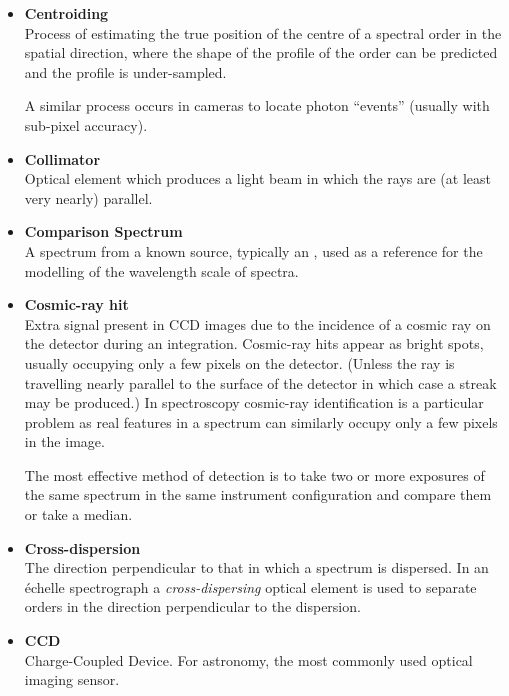 \begin{itemize}
\item {\bf\label{gl_centroiding}Centroiding}\\
      Process of estimating the true position of the centre of a spectral
      order in the spatial direction, where the shape of the profile of
      the order can be predicted and the profile is under-sampled.

      A similar process occurs in  cameras to
      locate photon ``events'' (usually with sub-pixel accuracy).

\item {\bf\label{gl_collimator}Collimator}\\
      Optical element which produces a light beam in which the rays
      are (at least very nearly) parallel.

\item {\bf\label{gl_comparison}Comparison Spectrum}\\
      A spectrum from a known source, typically an
      ,
      used as a reference for the modelling of the wavelength scale of
      spectra.

\item {\bf\label{gl_cosmic_ray}Cosmic-ray hit}\\
      Extra signal present in CCD images due to the incidence of a cosmic
      ray on the detector during an integration.  Cosmic-ray hits appear
      as bright spots, usually occupying only a few pixels on the detector.
      (Unless the ray is travelling nearly parallel to the surface of the
      detector in which case a streak may be produced.)
      In spectroscopy cosmic-ray identification is a particular problem
      as real features in a spectrum can similarly occupy only a few pixels
      in the image.

      The most effective method of detection is to take
      two or more exposures of the same spectrum in the same instrument
      configuration and compare them or take a median.

\item {\bf\label{gl_cross_dispersion}Cross-dispersion}\\
      The direction perpendicular to that in which a spectrum is
      dispersed.  In an \'{e}chelle spectrograph a {\sl cross-dispersing}
      optical element is used to separate orders in the
      direction perpendicular to the dispersion.

\item {\bf\label{gl_ccd}CCD}\\
      Charge-Coupled Device.   For astronomy, the most commonly used
      optical imaging sensor.


\end{itemize}
